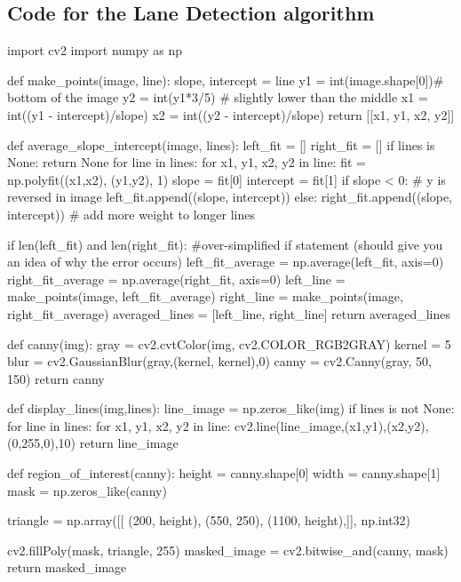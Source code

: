\begin{appendices}
\subsection{Code for the Lane Detection algorithm}\label{laneDetect}
\begin{python}
import cv2
import numpy as np
 
def make_points(image, line):
    slope, intercept = line
    y1 = int(image.shape[0])# bottom of the image
    y2 = int(y1*3/5)         # slightly lower than the middle
    x1 = int((y1 - intercept)/slope)
    x2 = int((y2 - intercept)/slope)
    return [[x1, y1, x2, y2]]
 
def average_slope_intercept(image, lines):
    left_fit    = []
    right_fit   = []
    if lines is None:
        return None
    for line in lines:
        for x1, y1, x2, y2 in line:
            fit = np.polyfit((x1,x2), (y1,y2), 1)
            slope = fit[0]
            intercept = fit[1]
            if slope < 0: # y is reversed in image
                left_fit.append((slope, intercept))
            else:
                right_fit.append((slope, intercept))
    # add more weight to longer lines

    if len(left_fit) and len(right_fit):
    #over-simplified if statement (should give you an idea of why the error occurs)
       left_fit_average  = np.average(left_fit, axis=0)
       right_fit_average = np.average(right_fit, axis=0)
       left_line  = make_points(image, left_fit_average)
       right_line = make_points(image, right_fit_average)
       averaged_lines = [left_line, right_line]
       return averaged_lines
 
def canny(img):
    gray = cv2.cvtColor(img, cv2.COLOR_RGB2GRAY)
    kernel = 5
    blur = cv2.GaussianBlur(gray,(kernel, kernel),0)
    canny = cv2.Canny(gray, 50, 150)
    return canny
 
def display_lines(img,lines):
    line_image = np.zeros_like(img)
    if lines is not None:
        for line in lines:
            for x1, y1, x2, y2 in line:
                cv2.line(line_image,(x1,y1),(x2,y2),(0,255,0),10)
    return line_image
 
def region_of_interest(canny):
    height = canny.shape[0]
    width = canny.shape[1]
    mask = np.zeros_like(canny)
 
    triangle = np.array([[
    (200, height),
    (550, 250),
    (1100, height),]], np.int32)
 
    cv2.fillPoly(mask, triangle, 255)
    masked_image = cv2.bitwise_and(canny, mask)
    return masked_image
 


\end{python}
\end{appendices}
